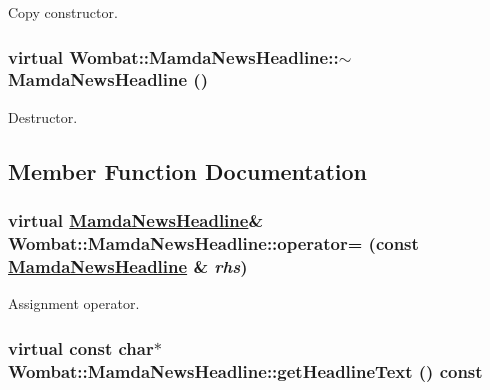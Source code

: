 Copy constructor. 

\hypertarget{classWombat_1_1MamdaNewsHeadline_ae7508978fbfeefb5bc976646aafc802}{
\subsubsection[$\sim$MamdaNewsHeadline]{\setlength{\rightskip}{0pt plus 5cm}virtual Wombat::Mamda\-News\-Headline::$\sim$Mamda\-News\-Headline ()}}
\label{classWombat_1_1MamdaNewsHeadline_ae7508978fbfeefb5bc976646aafc802}


Destructor. 



\subsection{Member Function Documentation}
\hypertarget{classWombat_1_1MamdaNewsHeadline_393f9ba427b7e37e471a147152293da1}{
\subsubsection[operator=]{\setlength{\rightskip}{0pt plus 5cm}virtual \hyperlink{classWombat_1_1MamdaNewsHeadline}{Mamda\-News\-Headline}\& Wombat::Mamda\-News\-Headline::operator= (const \hyperlink{classWombat_1_1MamdaNewsHeadline}{Mamda\-News\-Headline} \& {\em rhs})}}
\label{classWombat_1_1MamdaNewsHeadline_393f9ba427b7e37e471a147152293da1}


Assignment operator. 

\hypertarget{classWombat_1_1MamdaNewsHeadline_7c4c336c485773a27dd12ccbc93bcfce}{
\subsubsection[getHeadlineText]{\setlength{\rightskip}{0pt plus 5cm}virtual const char$\ast$ Wombat::Mamda\-News\-Headline::get\-Headline\-Text () const}}
\label{classWombat_1_1MamdaNewsHeadline_7c4c336c485773a27dd12ccbc93bcfce}


